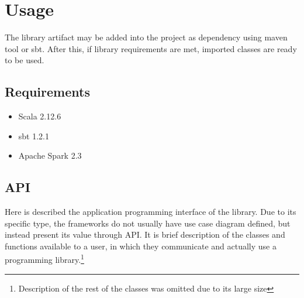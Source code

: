 \section{Usage}
The library artifact may be added into the project as dependency using maven tool or sbt. After this, if library requirements are met, imported classes are ready to be used.

\subsection{Requirements}
\begin{itemize}
\item Scala 2.12.6
\item sbt 1.2.1
\item Apache Spark 2.3

\end{itemize}

\bigbreak
\subsection{API}
Here is described the application programming interface of the library. Due to its specific type, the frameworks do not usually have use case diagram defined, but instead present its value through API. It is brief description of the classes and functions available to a user, in which they communicate and actually use a programming library.\footnote{Description of the rest of the classes was omitted due to its large size}

